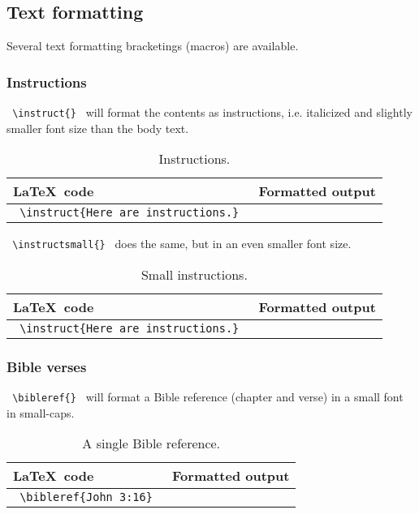 \documentclass{article}
\begin{document}
\subsection{Text formatting}

Several text formatting bracketings (macros) are available.

\subsubsection{Instructions}

\lstinline! \instruct{} ! will format the contents as instructions, i.e. italicized and slightly smaller font size than the body text.

\begin{table}[h!]
	\centering
	\begin{tabular}{l l} 
	\toprule
	\LaTeX\ code & Formatted output \\
	\midrule
	\lstinline! \instruct{Here are instructions.} ! & \sabon{\instruct{Here are instructions.}} \\
	\bottomrule
	\end{tabular}
	\caption{Instructions.}
\end{table}

\lstinline! \instructsmall{} ! does the same, but in an even smaller font size.

\begin{table}[h!]
	\centering
	\begin{tabular}{l l} 
	\toprule
	\LaTeX\ code & Formatted output \\
	\midrule
	\lstinline! \instruct{Here are instructions.} ! & \sabon{\instructsmall{Here are instructions.}} \\
	\bottomrule
	\end{tabular}
	\caption{Small instructions.}
\end{table}

\subsubsection{Bible verses}

\lstinline! \bibleref{} ! will format a Bible reference (chapter and verse) in a small font in small-caps.

\begin{table}[h!]
	\centering
	\begin{tabular}{l l} 
	\toprule
	\LaTeX\ code & Formatted output \\
	\midrule
	\lstinline! \bibleref{John 3:16} ! & \sabon{\bibleref{John 3:16}} \\
	\bottomrule
	\end{tabular}
	\caption{A single Bible reference.}
\end{table}
\end{document}
